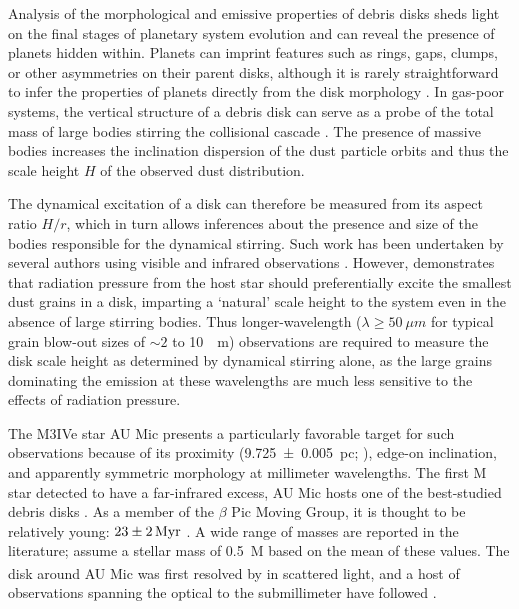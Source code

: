 \documentclass[modern]{aastex62}
\begin{document}
Analysis of the morphological and emissive properties of debris disks sheds light on the final stages of planetary system evolution and can reveal the presence of planets hidden within.
Planets can imprint features such as rings, gaps, clumps, or other asymmetries on their parent disks, although it is rarely straightforward to infer the properties of planets directly from the disk morphology \citep[see the review by][and references therein]{hughes18}.
In gas-poor systems, the vertical structure of a debris disk can serve as a probe of the total mass of large bodies stirring the collisional cascade \citep{thebault09}.
The presence of massive bodies increases the inclination dispersion of the dust particle orbits and thus the scale height $H$ of the observed dust distribution.

The dynamical excitation of a disk can therefore be measured from its aspect ratio $H/r$, which in turn allows inferences about the presence and size of the bodies responsible for the dynamical stirring.
Such work has been undertaken by several authors using visible and infrared observations \citep{artymowicz97,thebault&augereau07,quillen07}.
However, \citet{thebault09} demonstrates that radiation pressure from the host star should preferentially excite the smallest dust grains in a disk, imparting a `natural' scale height to the system even in the absence of large stirring bodies. 
Thus longer-wavelength ($\lambda \geq \SI{50}{\mu m}$ for typical grain blow-out sizes of $\sim 2$ to \SI{10}{\mu m}) observations are required to measure the disk scale height as determined by dynamical stirring alone, as the large grains dominating the emission at these wavelengths are much less sensitive to the effects of radiation pressure.

The M3IVe star AU Mic presents a particularly favorable target for such observations because of its proximity (\SI{9.725 \pm 0.005}{pc}; \citealp{gaia16,gaia_DR2}), edge-on inclination, and apparently symmetric morphology at millimeter wavelengths.
The first M star detected to have a far-infrared excess, AU Mic hosts one of the best-studied debris disks \citep{moshir90}. 
As a member of the $\beta$ Pic Moving Group, it is thought to be relatively young: $\SI{23 \pm 2}{Myr}$ \citep{binks&jeffries14,mamajek&bell14,malo14}. 
A wide range of masses \citep[\SIrange{0.3}{0.6}{M_\sun};][]{plavchan09,houdebine&doyle94} are reported in the literature; \citet{schuppler17} assume a stellar mass of \SI{0.5}{M_\sun} based on the mean of these values.
The disk around AU Mic was first resolved by \citet{kalas04} in scattered light, and a host of observations spanning the optical to the submillimeter have followed \citep{augereau&beust06,macgregor13,schneider14,matthews15,wang15}. 
\end{document}
